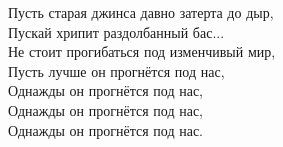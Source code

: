 \documentclass[fleqn,a5paper,12pt,twoside]{guitartabs}
\begin{document}
    \-\hspace{3mm}Пусть старая джинса давно затерта до дыр,     \\                      
    \-\hspace{3mm}Пускай хрипит раздолбанный бас...\\
    \-\hspace{3mm}Не стоит прогибаться под изменчивый мир,    \\      
    \-\hspace{3mm}Пусть лучше он прогнётся под нас,  \\     
    \-\hspace{3mm}Однажды он прогнётся под нас,      \\ 
    \-\hspace{3mm}Однажды он прогнётся под нас,   \\   
    \-\hspace{3mm}Однажды он прогнётся под нас.\\
\newpage
{}%
\end{document}
